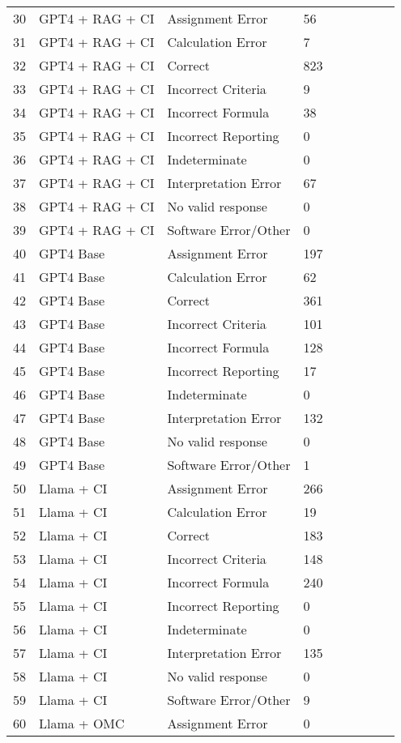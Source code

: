 \begin{tabular}{|l|l|l|l|l|l|l|l|l|}
30 & GPT4 + RAG + CI & Assignment Error & 56 \\
31 & GPT4 + RAG + CI & Calculation Error & 7 \\
32 & GPT4 + RAG + CI & Correct & 823 \\
33 & GPT4 + RAG + CI & Incorrect Criteria & 9 \\
34 & GPT4 + RAG + CI & Incorrect Formula & 38 \\
35 & GPT4 + RAG + CI & Incorrect Reporting & 0 \\
36 & GPT4 + RAG + CI & Indeterminate & 0 \\
37 & GPT4 + RAG + CI & Interpretation Error & 67 \\
38 & GPT4 + RAG + CI & No valid response & 0 \\
39 & GPT4 + RAG + CI & Software Error/Other & 0 \\
40 & GPT4 Base & Assignment Error & 197 \\
41 & GPT4 Base & Calculation Error & 62 \\
42 & GPT4 Base & Correct & 361 \\
43 & GPT4 Base & Incorrect Criteria & 101 \\
44 & GPT4 Base & Incorrect Formula & 128 \\
45 & GPT4 Base & Incorrect Reporting & 17 \\
46 & GPT4 Base & Indeterminate & 0 \\
47 & GPT4 Base & Interpretation Error & 132 \\
48 & GPT4 Base & No valid response & 0 \\
49 & GPT4 Base & Software Error/Other & 1 \\
50 & Llama + CI & Assignment Error & 266 \\
51 & Llama + CI & Calculation Error & 19 \\
52 & Llama + CI & Correct & 183 \\
53 & Llama + CI & Incorrect Criteria & 148 \\
54 & Llama + CI & Incorrect Formula & 240 \\
55 & Llama + CI & Incorrect Reporting & 0 \\
56 & Llama + CI & Indeterminate & 0 \\
57 & Llama + CI & Interpretation Error & 135 \\
58 & Llama + CI & No valid response & 0 \\
59 & Llama + CI & Software Error/Other & 9 \\
60 & Llama + OMC & Assignment Error & 0 \\

\end{tabular}
